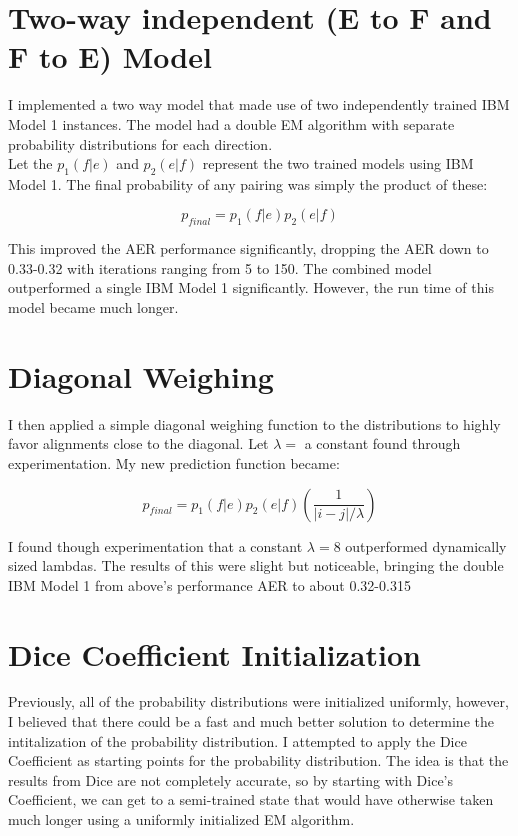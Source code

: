 \documentclass{article}
\begin{document}
\section{Two-way independent (E to F and F to E) Model}

I implemented a two way model that made use of two independently trained IBM Model 1 instances. The model had a double EM algorithm with separate probability distributions for each direction.\\

Let the $p_1(f|e)$ and $p_2(e|f)$ represent the two trained models using IBM Model 1. The final probability of any pairing was simply the product of these:

\[
p_{final}=p_1(f|e)p_2(e|f)
\]

This improved the AER performance significantly, dropping the AER down to 0.33-0.32 with iterations ranging from 5 to 150. The combined model outperformed a single IBM Model 1 significantly. However, the run time of this model became much longer.

\section{Diagonal Weighing}

I then applied a simple diagonal weighing function to the distributions to highly favor alignments close to the diagonal. Let $\lambda = $ a constant found through experimentation. My new prediction function became:

\[
p_{final}=p_1(f|e)p_2(e|f) (\frac{1}{|i-j| / \lambda})
\]


I found though experimentation that a constant $\lambda = 8$ outperformed dynamically sized lambdas. The results of this were slight but noticeable, bringing the double IBM Model 1 from above's performance AER to about 0.32-0.315 

\section{Dice Coefficient Initialization}

Previously, all of the probability distributions were initialized uniformly, however, I believed that there could be a fast and much better solution to determine the intitalization of the probability distribution. I attempted to apply the Dice Coefficient as starting points for the probability distribution. The idea is that the results from Dice are not completely accurate, so by starting with Dice's Coefficient, we can get to a semi-trained state that would have otherwise taken much longer using a uniformly initialized EM algorithm.\\
\end{document}

